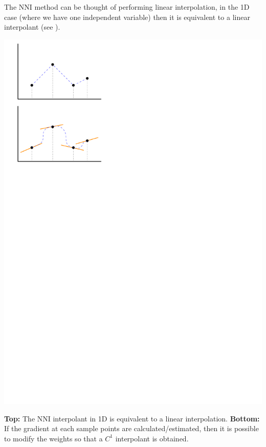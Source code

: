The NNI method can be thought of performing linear interpolation, in the 1D case (where we have one independent variable) then it is equivalent to a linear interpolant (see ).
\begin{marginfigure}
  \centering
  \includegraphics[width=\linewidth]{figs/nni-1d}
  \caption{\textbf{Top:} The NNI interpolant in 1D is equivalent to a linear interpolation. \textbf{Bottom:} If the gradient at each sample points are calculated/estimated, then it is possible to modify the weights so that a $C^1$ interpolant is obtained.}%
\end{marginfigure}

%

